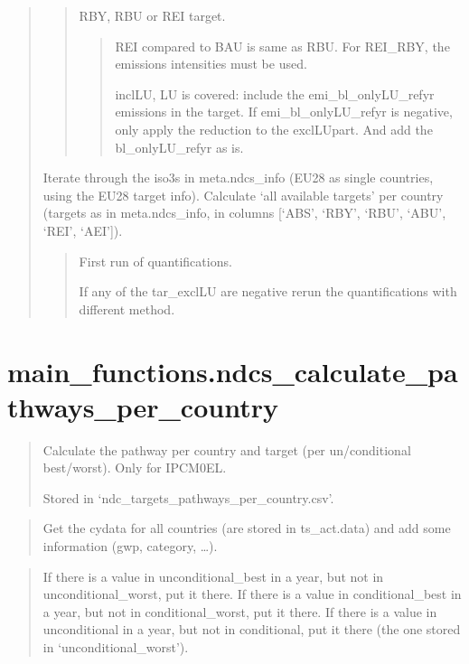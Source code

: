 \documentclass[letterpaper,10pt,english]{sphinxmanual}
\begin{document}
\begin{quote}
\begin{quote}
RBY, RBU or REI target.
\begin{quote}

REI compared to BAU is same as RBU.
For REI\_RBY, the emissions intensities must be used.

inclLU, LU is covered: include the emi\_bl\_onlyLU\_refyr emissions in the target.
If emi\_bl\_onlyLU\_refyr is negative, only apply the reduction to the exclLU\sphinxhyphen{}part.
And add the bl\_onlyLU\_refyr as is.
\end{quote}
\end{quote}

Iterate through the iso3s in meta.ndcs\_info (EU28 as single countries, using the EU28 target info).
Calculate ‘all available targets’ per country (targets as in meta.ndcs\_info, in columns
{[}‘ABS’, ‘RBY’, ‘RBU’, ‘ABU’, ‘REI’, ‘AEI’{]}).
\begin{quote}

First run of quantifications.

If any of the tar\_exclLU are negative re\sphinxhyphen{}run the quantifications with different method.
\end{quote}
\end{quote}


\chapter{main\_functions.ndcs\_calculate\_pathways\_per\_country}
\label{\detokenize{code:main-functions-ndcs-calculate-pathways-per-country}}
\begin{quote}

Calculate the pathway per country and target (per un/conditional best/worst).
Only for IPCM0EL.

Stored in ‘ndc\_targets\_pathways\_per\_country.csv’.
\end{quote}

\begin{quote}

Get the cydata for all countries (are stored in ts\_act.data) and add some information (gwp, category, …).
\end{quote}

\begin{quote}

If there is a value in unconditional\_best in a year, but not in unconditional\_worst, put it there.
If there is a value in conditional\_best in a year, but not in conditional\_worst, put it there.
If there is a value in unconditional in a year, but not in conditional, put it there (the one
stored in ‘unconditional\_worst’).
\end{quote}
\end{document}
